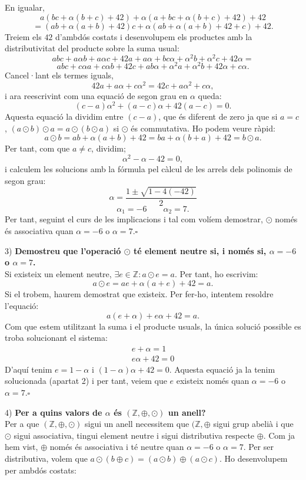 \documentclass[11pt]{article}
\begin{document}
\begin{legal}
\begin{legal}
\begin{itemize}
		\end{itemize}
		En igualar,
		$$
		a(bc+\alpha(b+c)+42)+\alpha(a+bc+\alpha(b+c)+42)+42
		$$
		$$
		=(ab+\alpha(a+b)+42)c+\alpha(ab+\alpha(a+b)+42+c)+42.
		$$
		Treiem els $42$ d'ambdós costats i desenvolupem els productes amb la distributivitat del producte sobre la suma usual:
		$$
		abc+a\alpha b+a\alpha c+42a+a\alpha+bc\alpha+\alpha^2b+\alpha^2c+42\alpha=
		$$
		$$
		abc+c\alpha a+c\alpha b+42c+ab\alpha+\alpha^2a+\alpha^2b+42\alpha+c\alpha.
		$$
		Cancel·lant els termes iguals,
		$$
		42a+a\alpha +c\alpha^2=42c+a\alpha^2+c\alpha,
		$$
		i ara reescrivint com una equació de segon grau en $\alpha$ queda:
		$$
		(c-a)\alpha^2+(a-c)\alpha+42(a-c)=0.
		$$
		Aquesta equació la dividim entre $(c-a)$, que és diferent de zero ja que si $a=c$, $(a\odot b)\odot a=a\odot(b\odot a)$ si $\odot$ és commutativa. Ho podem veure ràpid:
		$$a\odot b=ab+\alpha(a+b)+42=ba+\alpha(b+a)+42=b\odot a.$$
		Per tant, com que $a\neq c$, dividim;
		$$
		\alpha^2-\alpha-42=0,
		$$
		i calculem les solucions amb la fórmula pel càlcul de les arrels dels polinomis de segon grau:
		$$
		\alpha=\dfrac{1\pm\sqrt{1-4(-42)}}{2}
		$$
		$$
		\alpha_1=-6\qquad\alpha_2=7.
		$$
		Per tant, seguint el curs de les implicacions i tal com volíem demostrar, $\odot$ només és associativa quan $\alpha=-6$ o $\alpha=7$.$\square$
		\item[3)] \textbf{Demostreu que l'operació $\odot$ té element neutre si, i només si, $\alpha=-6$ o $\alpha=7$.}\\
		Si existeix un element neutre, $\exists e\in\mathbb{Z}:a\odot e=a$. Per tant, ho escrivim:
		$$a\odot e=ae+\alpha(a+e)+42=a.$$
		Si el trobem, haurem demostrat que existeix. Per fer-ho, intentem resoldre l'equació:
		$$a(e+\alpha)+e\alpha+42=a.$$
		Com que estem utilitzant la suma i el producte usuals, la única solució possible es troba solucionant el sistema:
		\[		
		\begin{array}{rcl}
			e+\alpha=1\\
			e\alpha+42=0
		\end{array}
		\]
		D'aquí tenim $e=1-\alpha$ i $(1-\alpha)\alpha+42=0$. Aquesta equació ja la tenim solucionada (apartat 2) i per tant, veiem que $e$ existeix només quan $\alpha=-6$ o $\alpha=7$.$\square$
		\item[4)] \textbf{Per a quins valors de $\alpha$ és $(\mathbb{Z},\oplus,\odot)$ un anell?}\\
		Per a que $(\mathbb{Z},\oplus,\odot)$ sigui un anell necessitem que $(\mathbb{Z},\oplus$ sigui grup abelià i que $\odot$ sigui associativa, tingui element neutre i sigui distributiva respecte $\oplus$. Com ja hem vist, $\oplus$ només és associativa i té neutre quan $\alpha=-6$ o $\alpha=7$. Per ser distributiva, volem que $a\odot(b\oplus c)=(a\odot b)\oplus(a\odot c)$. Ho desenvolupem per ambdós costats:

\end{legal}
\end{legal}
\end{document}
